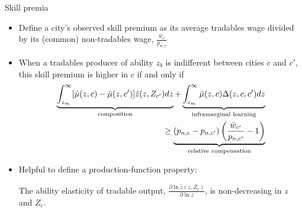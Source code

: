 \documentclass[10pt,notes=hide]{beamer}
\begin{document}
\begin{frame}{Skill premia}
\begin{itemize}
	\item Define a city's observed skill premium as its average tradables wage divided by its (common) non-tradables wage, $\frac{\bar{w}_{c}}{p_{n,c}}$
	\item When a tradables producer of ability $z_b$ is indifferent between cities $c$ and $c'$, this skill premium is higher in $c$ if and only if
\begin{align*} %
\underbrace{\int_{z_m}^{\infty}[\tilde{\mu}(z,c)-\tilde{\mu}(z,c')]\tilde{z}(z,Z_{c'})dz}_{\textnormal{composition}}+\underbrace{\int_{z_m}^{\infty}\tilde{\mu}(z,c)\Delta(z,c,c')dz}_{\textnormal{inframarginal learning}} \\
\geq \underbrace{\left(p_{n,c}-p_{n,c'}\right)\left(\frac{\bar{w}_{c'}}{p_{n,c'}}-1\right)}_{\textnormal{relative compensation}}\label{eqn:premia_decomp}
\end{align*}
	\item Helpful to define a production-function property: 
	\begin{condition}\label{condition:outputelasticity}
	The ability elasticity of tradable output,
	$\frac{\partial\ln\tilde{z}\left(z,Z_{c}\right)}{\partial\ln z}$,
	is non-decreasing in $z$ and $Z_{c}$.
	\end{condition}
\end{itemize}
\end{frame}
\end{document}
